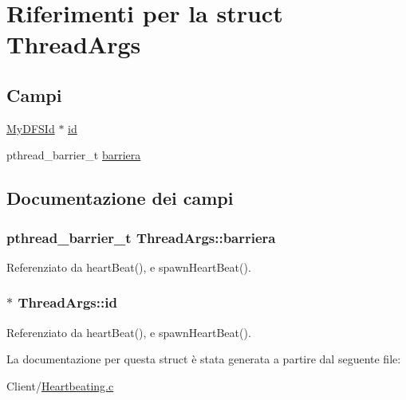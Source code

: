 \hypertarget{structThreadArgs}{}\section{Riferimenti per la struct Thread\+Args}
\label{structThreadArgs}
\subsection*{Campi}
\begin{DoxyCompactItemize}
\item 
\hyperlink{structMyDFSId}{My\+D\+F\+S\+Id} $\ast$ \hyperlink{structThreadArgs_ab54572644fa37e1d2fa284d4217fc372}{id}
\item 
pthread\+\_\+barrier\+\_\+t \hyperlink{structThreadArgs_a7ca0bdd546803a7e595b376aac79347c}{barriera}
\end{DoxyCompactItemize}


\subsection{Documentazione dei campi}
\subsubsection[{\texorpdfstring{barriera}{barriera}}]{\setlength{\rightskip}{0pt plus 5cm}pthread\+\_\+barrier\+\_\+t Thread\+Args\+::barriera}\hypertarget{structThreadArgs_a7ca0bdd546803a7e595b376aac79347c}{}\label{structThreadArgs_a7ca0bdd546803a7e595b376aac79347c}


Referenziato da heart\+Beat(), e spawn\+Heart\+Beat().

\subsubsection[{\texorpdfstring{id}{id}}]{$\ast$ Thread\+Args\+::id}\hypertarget{structThreadArgs_ab54572644fa37e1d2fa284d4217fc372}{}\label{structThreadArgs_ab54572644fa37e1d2fa284d4217fc372}


Referenziato da heart\+Beat(), e spawn\+Heart\+Beat().



La documentazione per questa struct è stata generata a partire dal seguente file\+:\begin{DoxyCompactItemize}
\item 
Client/\hyperlink{Client_2Heartbeating_8c}{Heartbeating.\+c}\end{DoxyCompactItemize}
